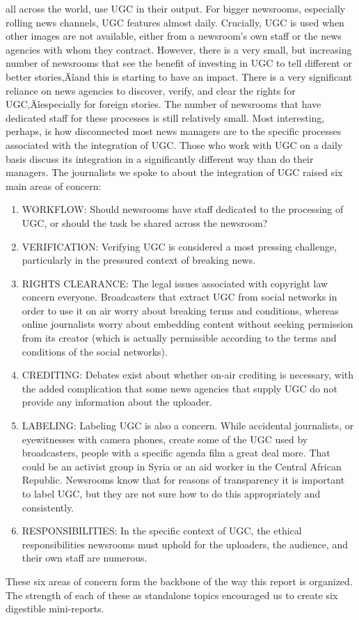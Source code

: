 \documentclass[symmetric, notoc, nobib]{towcenter-book}
\begin{document}
all across the world, use UGC in their output. For bigger newsrooms, especially rolling news channels, UGC features almost daily. Crucially, UGC is used when other images are not available, either from a newsroom's own
staff or the news agencies with whom they contract. However, there is a
very small, but increasing number of newsrooms that see the benefit of
investing in UGC to tell different or better stories‚Äîand this is starting to
have an impact.
There is a very significant reliance on news agencies to discover, verify,
and clear the rights for UGC‚Äîespecially for foreign stories. The number
of newsrooms that have dedicated staff for these processes is still
relatively small.
Most interesting, perhaps, is how disconnected most news managers are to
the specific processes associated with the integration of UGC. Those who
work with UGC on a daily basis discuss its integration in a significantly different
way than do their managers.
The journalists we spoke to about the integration of UGC raised six main
areas of concern:
\begin{enumerate}
\item WORKFLOW: Should newsrooms have staff dedicated to
the processing of UGC, or should the task be shared across
the newsroom?
\item VERIFICATION: Verifying UGC is considered a most pressing
challenge, particularly in the pressured context of breaking news.
\item RIGHTS CLEARANCE: The legal issues associated with copyright
law concern everyone. Broadcasters that extract UGC from
social networks in order to use it on air worry about breaking
terms and conditions, whereas online journalists worry about
embedding content without seeking permission from its creator
(which is actually permissible according to the terms and conditions
of the social networks).
\item CREDITING: Debates exist about whether on-air crediting is
necessary, with the added complication that some news
agencies that supply UGC do not provide any information about
the uploader.
\item LABELING: Labeling UGC is also a concern. While accidental
journalists, or eyewitnesses with camera phones, create some
of the UGC used by broadcasters, people with a specific agenda
film a great deal more. That could be an activist group in Syria
or an aid worker in the Central African Republic. Newsrooms
know that for reasons of transparency it is important to
label UGC, but they are not sure how to do this appropriately
and consistently.
\item RESPONSIBILITIES: In the specific context of UGC, the ethical
responsibilities newsrooms must uphold for the uploaders,
the audience, and their own staff are numerous.
\end{enumerate}
These six areas of concern form the backbone of the way this report is organized.
The strength of each of these as standalone topics encouraged us to
create six digestible mini-reports.
\end{document}
